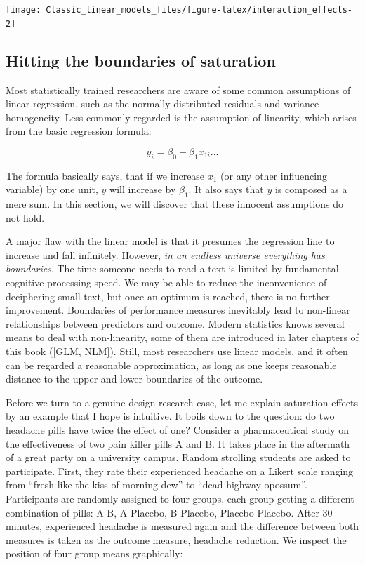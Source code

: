 \documentclass[]{svmono}
\begin{document}
\texttt{[image: Classic\_linear\_models\_files/figure-latex/interaction\_effects-2]}

\subsection{Hitting the boundaries of
saturation}\label{hitting-the-boundaries-of-saturation}

Most statistically trained researchers are aware of some common
assumptions of linear regression, such as the normally distributed
residuals and variance homogeneity. Less commonly regarded is the
assumption of linearity, which arises from the basic regression formula:

\[y_i = \beta_0 + \beta_1 x_{1i} ...\]

The formula basically says, that if we increase \(x_1\) (or any other
influencing variable) by one unit, \(y\) will increase by \(\beta_1\).
It also says that \(y\) is composed as a mere sum. In this section, we
will discover that these innocent assumptions do not hold.

A major flaw with the linear model is that it presumes the regression
line to increase and fall infinitely. However, \emph{in an endless
universe everything has boundaries}. The time someone needs to read a
text is limited by fundamental cognitive processing speed. We may be
able to reduce the inconvenience of deciphering small text, but once an
optimum is reached, there is no further improvement. Boundaries of
performance measures inevitably lead to non-linear relationships between
predictors and outcome. Modern statistics knows several means to deal
with non-linearity, some of them are introduced in later chapters of
this book ({[}GLM, NLM{]}). Still, most researchers use linear models,
and it often can be regarded a reasonable approximation, as long as one
keeps reasonable distance to the upper and lower boundaries of the
outcome.

Before we turn to a genuine design research case, let me explain
saturation effects by an example that I hope is intuitive. It boils down
to the question: do two headache pills have twice the effect of one?
Consider a pharmaceutical study on the effectiveness of two pain killer
pills A and B. It takes place in the aftermath of a great party on a
university campus. Random strolling students are asked to participate.
First, they rate their experienced headache on a Likert scale ranging
from ``fresh like the kiss of morning dew'' to ``dead highway opossum''.
Participants are randomly assigned to four groups, each group getting a
different combination of pills: A-B, A-Placebo, B-Placebo,
Placebo-Placebo. After 30 minutes, experienced headache is measured
again and the difference between both measures is taken as the outcome
measure, headache reduction. We inspect the position of four group means
graphically:
\end{document}
